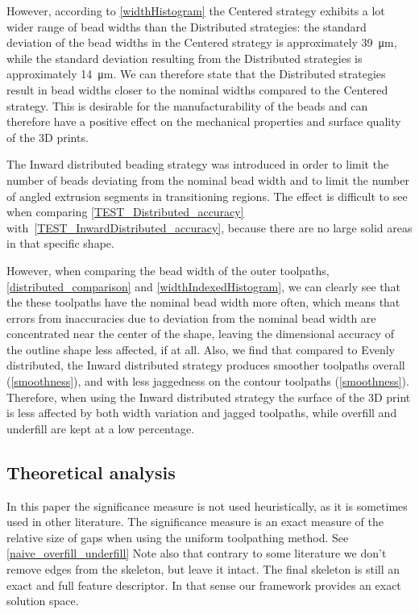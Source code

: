 However, according to \cref{widthHistogram} the Centered strategy exhibits a lot wider range of bead widths than the Distributed strategies:
the standard deviation of the bead widths in the Centered strategy is approximately \SI{39}{\micro\meter}, while the standard deviation resulting from the Distributed strategies is approximately \SI{14}{\micro\meter}.
We can therefore state that the Distributed strategies result in bead widths closer to the nominal widths compared to the Centered strategy.
This is desirable for the manufacturability of the beads and can therefore have a positive effect on the mechanical properties and surface quality of the 3D prints. 

The Inward distributed beading strategy was introduced in order to limit the number of beads deviating from the nominal bead width and to limit the number of angled extrusion segments in transitioning regions.
The effect is difficult to see when comparing \cref{TEST_Distributed_accuracy} with~\ref{TEST_InwardDistributed_accuracy}, because there are no large solid areas in that specific shape.

However, when comparing the bead width of the outer toolpaths, \cref{distributed_comparison} and  \cref{widthIndexedHistogram}, we can clearly see that the these toolpaths have the nominal bead width more often, which means that errors from inaccuracies due to deviation from the nominal bead width are concentrated near the center of the shape, leaving the dimensional accuracy of the outline shape less affected, if at all. 
Also, we find that compared to Evenly distributed, the Inward distributed strategy produces smoother toolpaths overall (\cref{smoothness}), and with less jaggedness on the contour toolpaths (\cref{smoothness}). 
Therefore, when using the Inward distributed strategy the surface of the 3D print is less affected by both width variation and jagged toolpaths, while overfill and underfill are kept at a low percentage.


\subsection{Theoretical analysis}
In this paper the significance measure is not used heuristically, as it is sometimes used in other literature.
The significance measure is an exact measure of the relative size of gaps when using the uniform toolpathing method.
See \cref{naive_overfill_underfill}
Note also that contrary to some literature we don't remove edges from the skeleton, but leave it intact.
The final skeleton is still an exact and full feature descriptor.
In that sense our framework provides an exact solution space.


